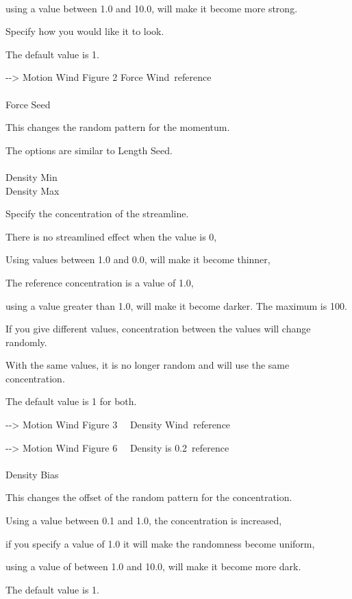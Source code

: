 \documentclass[a4paper,12pt]{article}
\begin{document}
\ \vspace{-0.2em}
\par
using a value between 1.0 and 10.0, will make it become more strong.\par
Specify how you would like it to look.\par
The default value is 1.\par
-{-}> \textquotedbl Motion Wind Figure 2 Force Wind\textquotedbl \ reference\\
\\
Force Seed\par
This changes the random pattern for the momentum.\par
The options are similar to \textquotedbl Length Seed\textquotedbl .\\
\\
Density Min\\
Density Max\par
Specify the concentration of the streamline.\par
There is no streamlined effect when the value is 0,\par
Using values between 1.0 and 0.0, will make it become thinner,\par
The reference concentration is a value of 1.0,\par
using a value greater than 1.0, will make it become darker. The maximum is 100.\par
If you give different values, concentration between the values will change randomly.\par
With the same values, it is no longer random and will use the same concentration.\par
The default value is 1 for both.\par
-{-}> \textquotedbl Motion Wind Figure 3 \ \ Density Wind\textquotedbl \ reference\par
-{-}> \textquotedbl Motion Wind Figure 6 \ \ Density is 0.2\textquotedbl \ reference\\
\\
Density Bias\par
This changes the offset of the random pattern for the concentration.\par
Using a value between 0.1 and 1.0, the concentration is increased,\par
if you specify a value of 1.0 it will make the randomness become uniform,\par
using a value of between 1.0 and 10.0, will make it become more dark.\par
The default value is 1.\par
\end{document}

